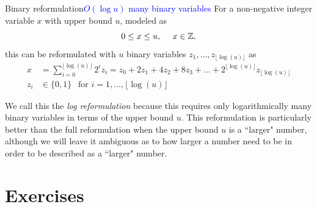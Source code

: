 \begin{general}{Binary reformulation}{\textcolor{blue}{$O(\log u)$ many binary variables}}
\label{general:log-reformulation}
For a non-negative integer variable $x$ with upper bound $u$, modeled as 
\begin{equation}
0 \leq x \leq u, \ \ \ \ x \in \mathbb{Z},
\end{equation}
this can be reformulated with $u$ binary variables $z_1, \dots, z_{\lfloor\log( u )\rfloor}$ as 
\begin{equation}
\begin{split}
x & = \sum_{i=0}^{\lfloor\log( u )\rfloor}2^i z_i = z_0 + 2 z_1 +  4 z_2 + 8 z_3 + \dots + 2^{\lfloor\log( u )\rfloor} z_{\lfloor\log( u )\rfloor}\\
z_i & \in \{0,1\} \ \ \text{ for } i=1, \dots, \lfloor\log( u )\rfloor
\end{split}
\end{equation}
\end{general}
We call this the \emph{log reformulation} because this requires only logarithmically many binary variables in terms of the upper bound $u$.   This reformulation is particularly better than the full reformulation when the upper bound $u$ is a ``larger" number, although we will leave it ambiguous as to how larger a number need to be in order to be described as a ``larger" number.
\fi  %

\section{Exercises}


